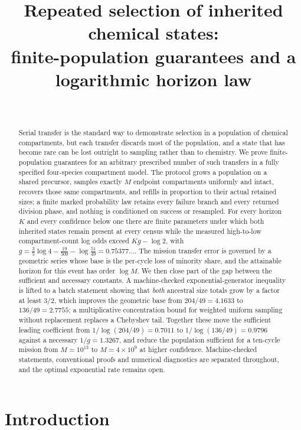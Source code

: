 \documentclass[11pt,a4paper]{article}
\title{Repeated selection of inherited chemical states:\\[4pt]
\large finite-population guarantees and a logarithmic horizon law}
\author{\PaperAuthor\\ \small \PaperAffiliation}
\date{\PaperDate}
\theoremstyle{plain}
\theoremstyle{definition}
\theoremstyle{remark}
\begin{document}
\maketitle

\begin{abstract}
Serial transfer is the standard way to demonstrate selection in a population of
chemical compartments, but each transfer discards most of the population, and a
state that has become rare can be lost outright to sampling rather than to
chemistry. We prove finite-population guarantees for an arbitrary prescribed
number of such transfers in a fully specified four-species compartment model.
The protocol grows a population on a shared precursor, samples exactly $M$
endpoint compartments uniformly and intact, recovers those same compartments,
and refills in proportion to their actual retained sizes; a finite marked
probability law retains every failure branch and every returned division phase,
and nothing is conditioned on success or resampled. For every horizon $K$ and
every confidence below one there are finite parameters under which both
inherited states remain present at every census while the measured
high-to-low compartment-count log odds exceed $Kg-\log2$, with
$g=\frac35\log4-\frac{19}{500}-\log\frac{51}{49}=0.75377\ldots$. The mission
transfer error is governed by a geometric series whose base is the per-cycle
loss of minority share, and the attainable horizon for this event has order
$\log M$. We then close part of the gap between the sufficient and necessary
constants. A machine-checked exponential-generator inequality is lifted to a
batch statement showing that \emph{both} ancestral size totals grow by a factor
at least $3/2$, which improves the geometric base from $204/49=4.1633$ to
$136/49=2.7755$; a multiplicative concentration bound for weighted uniform
sampling without replacement replaces a Chebyshev tail. Together these move the
sufficient leading coefficient from $1/\log(204/49)=0.7011$ to
$1/\log(136/49)=0.9796$ against a necessary $1/g=1.3267$, and reduce the
population sufficient for a ten-cycle mission from $M=10^{13}$ to
$M=4\times10^{9}$ at higher confidence. Machine-checked statements,
conventional proofs and numerical diagnostics are separated throughout, and
the optimal exponential rate remains open.
\end{abstract}

\tableofcontents

\section{Introduction}\label{sec:intro}
\end{document}

